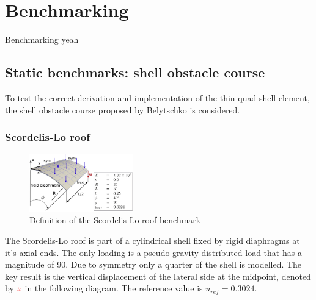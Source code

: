 


\renewcommand{\Thema}{Benchmarking}



\chapter{Benchmarking}

Benchmarking yeah

\section{Static benchmarks: shell obstacle course}

To test the correct derivation and implementation of the thin quad shell element, the shell obstacle course proposed by Belytschko \cite{Bel85} is considered.

\subsection{Scordelis-Lo roof}

\begin{figure}
	\centering
	\includegraphics[width=0.40\textwidth]{images/scordelisroof.png}
	\caption{Definition of the Scordelis-Lo roof benchmark\cite{Bou13}}
\end{figure}

The Scordelis-Lo roof is part of a cylindrical shell fixed by rigid diaphragms at it's axial ends. The only loading is a pseudo-gravity distributed load that has a magnitude of 90. Due to symmetry only a quarter of the shell is modelled. The key result is the vertical displacement of the lateral side at the midpoint, denoted by $\textcolor{red}{u}$ in the following diagram. The reference value is $u_{ref} = 0.3024$.



